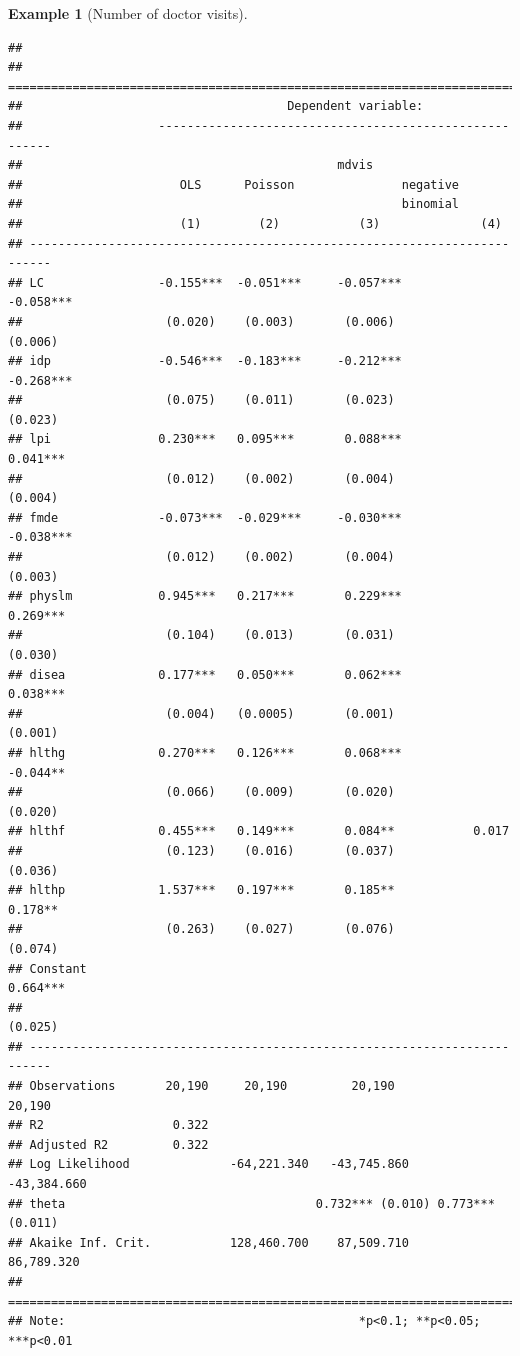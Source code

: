 \documentclass[
  12pt,
]{book}
\theoremstyle{definition}
\theoremstyle{definition}
\newtheorem{example}{Example}[chapter]
\theoremstyle{definition}
\theoremstyle{definition}
\theoremstyle{remark}
\begin{document}
\begin{example}[Number of doctor visits]
\begin{verbatim}
## 
## =========================================================================
##                                     Dependent variable:                  
##                   -------------------------------------------------------
##                                            mdvis                         
##                      OLS      Poisson               negative             
##                                                     binomial             
##                      (1)        (2)           (3)              (4)       
## -------------------------------------------------------------------------
## LC                -0.155***  -0.051***     -0.057***        -0.058***    
##                    (0.020)    (0.003)       (0.006)          (0.006)     
## idp               -0.546***  -0.183***     -0.212***        -0.268***    
##                    (0.075)    (0.011)       (0.023)          (0.023)     
## lpi               0.230***   0.095***       0.088***         0.041***    
##                    (0.012)    (0.002)       (0.004)          (0.004)     
## fmde              -0.073***  -0.029***     -0.030***        -0.038***    
##                    (0.012)    (0.002)       (0.004)          (0.003)     
## physlm            0.945***   0.217***       0.229***         0.269***    
##                    (0.104)    (0.013)       (0.031)          (0.030)     
## disea             0.177***   0.050***       0.062***         0.038***    
##                    (0.004)   (0.0005)       (0.001)          (0.001)     
## hlthg             0.270***   0.126***       0.068***         -0.044**    
##                    (0.066)    (0.009)       (0.020)          (0.020)     
## hlthf             0.455***   0.149***       0.084**           0.017      
##                    (0.123)    (0.016)       (0.037)          (0.036)     
## hlthp             1.537***   0.197***       0.185**          0.178**     
##                    (0.263)    (0.027)       (0.076)          (0.074)     
## Constant                                                     0.664***    
##                                                              (0.025)     
## -------------------------------------------------------------------------
## Observations       20,190     20,190         20,190           20,190     
## R2                  0.322                                                
## Adjusted R2         0.322                                                
## Log Likelihood              -64,221.340   -43,745.860      -43,384.660   
## theta                                   0.732*** (0.010) 0.773*** (0.011)
## Akaike Inf. Crit.           128,460.700    87,509.710       86,789.320   
## =========================================================================
## Note:                                         *p<0.1; **p<0.05; ***p<0.01
\end{verbatim}


\end{example}
\end{document}
